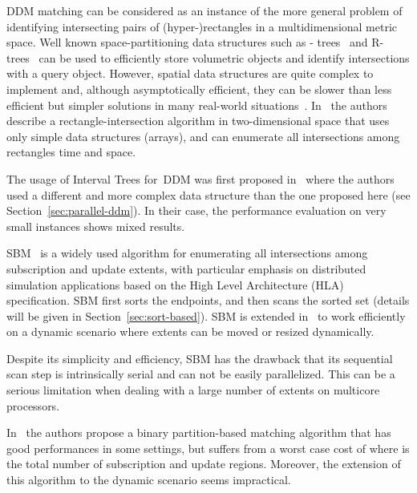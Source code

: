 \documentclass[10pt, conference, compsocconf]{IEEEtran}
\begin{document}
\ac{DDM} matching can be considered as an instance of the more general
problem of identifying intersecting pairs of (hyper-)rectangles in a
multidimensional metric space. Well known space-partitioning data
structures such as - trees~\cite{Rosenberg1985} and
R-trees~\cite{Guttman1984} can be used to efficiently store volumetric
objects and identify intersections with a query object. However,
spatial data structures are quite complex to implement and, although
asymptotically efficient, they can be slower than less efficient but
simpler solutions in many real-world situations~\cite{petty-1997}.
In~\cite{Devai2010} the authors describe a rectangle-intersection
algorithm in two-dimensional space that uses only simple data
structures (arrays), and can enumerate all  intersections among 
rectangles  time and  space.

The usage of Interval Trees for~\ac{DDM} was first proposed
in~\cite{petty-1997} where the authors used a different and more
complex data structure than the one proposed here (see
Section~\ref{sec:parallel-ddm}). In their case, the performance
evaluation on very small instances shows mixed results.

\ac{SBM}~\cite{Raczy2005} is a widely used algorithm for enumerating
all intersections among subscription and update extents, with
particular emphasis on distributed simulation applications based on
the High Level Architecture (HLA) specification. \ac{SBM} first sorts
the endpoints, and then scans the sorted set (details will be given in
Section~\ref{sec:sort-based}). \ac{SBM} is extended in~\cite{Pan2011}
to work efficiently on a dynamic scenario where extents can be moved
or resized dynamically.

Despite its simplicity and efficiency, \ac{SBM} has the drawback that
its sequential scan step is intrinsically serial and can not be easily
parallelized. This can be a serious limitation when dealing with a
large number of extents on multicore processors.

In~\cite{6147978} the authors propose a binary partition-based
matching algorithm that has good performances in some settings, but
suffers from a worst case cost of  where  is the
total number of subscription and update regions. Moreover, the
extension of this algorithm to the dynamic scenario seems impractical.
\end{document}

